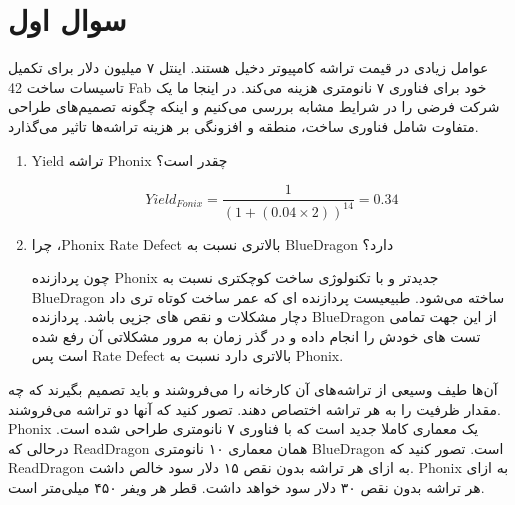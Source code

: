 \section{سوال اول}

عوامل زیادی در قیمت تراشه کامپیوتر دخیل هستند. اینتل ۷ میلیون دلار برای تکمیل تاسیسات ساخت 42 Fab خود برای فناوری ۷ نانومتری هزینه می‌کند. در اینجا ما یک شرکت فرضی را در شرایط مشابه بررسی می‌کنیم و اینکه چگونه تصمیم‌های طراحی متفاوت شامل فناوری ساخت، منطقه و افزونگی بر هزینه تراشه‌ها تاثیر می‌گذارد.
\begin{enumerate}
	\item Yield تراشه Phonix چقدر است؟
	\begin{qsolve}
		\begin{equation}
			Yield_{Fonix} = \frac{1}{(1 + (0.04 \times 2))^{14}} = 0.34
		\end{equation}
	\end{qsolve}
	\item چرا ،Phonix Rate Defect بالاتری نسبت به BlueDragon دارد؟
	\begin{qsolve}
چون پردازنده Phonix جدیدتر و با تکنولوژی ساخت کوچکتری نسبت به BlueDragon ساخته می‌شود. طبیعیست پردازنده ای که عمر ساخت کوتاه تری داد دچار مشکلات و نقص های جزپی باشد. پردازنده BlueDragon از این جهت تمامی تست های خودش را انجام داده و در گذر زمان به مرور مشکلاتی آن رفع شده است پس Rate Defect بالا‌تری دارد نسبت به Phonix.
	\end{qsolve}
\end{enumerate}

آن‌ها طیف وسیعی از تراشه‌های آن کارخانه را می‌فروشند و باید تصمیم بگیرند که چه مقدار ظرفیت را به هر تراشه اختصاص دهند. تصور کنید که آنها دو تراشه می‌فروشند. Phonix یک معماری کاملا جدید است که با فناوری ۷ نانومتری طراحی شده است. درحالی که ReadDragon همان معماری ۱۰ نانومتری BlueDragon است. تصور کنید که ReadDragon به ازای هر تراشه بدون نقص ۱۵ دلار سود خالص داشت. Phonix به ازای هر تراشه بدون نقص ۳۰ دلار سود خواهد داشت. قطر هر ویفر ۴۵۰ میلی‌متر است.

